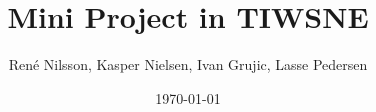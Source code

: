 \documentclass[]{report}
\begin{document}
\title{Mini Project in TIWSNE}
\author{Ren\'e Nilsson, Kasper Nielsen, Ivan Grujic, Lasse Pedersen}


\date{\today}
\maketitle
{}







  
\end{document}

